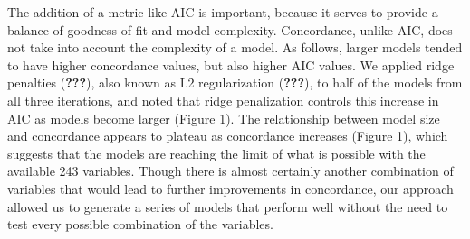 \documentclass[12pt,twoside]{reedthesis}
\theoremstyle{definition}
\theoremstyle{definition}
\theoremstyle{definition}
\theoremstyle{remark}
\begin{document}
The addition of a metric like AIC is important, because it serves to
provide a balance of goodness-of-fit and model complexity. Concordance,
unlike AIC, does not take into account the complexity of a model. As
follows, larger models tended to have higher concordance values, but
also higher AIC values. We applied ridge penalties ({\textbf{???}}),
also known as L2 regularization ({\textbf{???}}), to half of the models
from all three iterations, and noted that ridge penalization controls
this increase in AIC as models become larger (Figure 1). The
relationship between model size and concordance appears to plateau as
concordance increases (Figure 1), which suggests that the models are
reaching the limit of what is possible with the available 243 variables.
Though there is almost certainly another combination of variables that
would lead to further improvements in concordance, our approach allowed
us to generate a series of models that perform well without the need to
test every possible combination of the variables.
\end{document}
